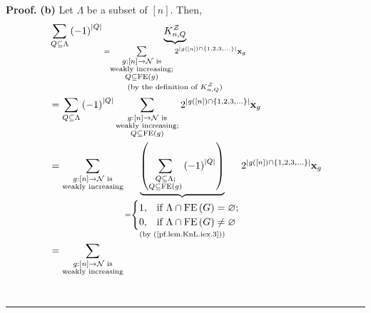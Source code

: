\documentclass[numbers=enddot,12pt,final,onecolumn,notitlepage]{scrartcl}%
\theoremstyle{definition}
\newenvironment{proof}[1][Proof]{\noindent\textbf{#1.} }{\ \rule{0.5em}{0.5em}}
\newenvironment{verlong}{}{}
\newenvironment{vershort}{}{}
\let\sumnonlimits\sum
\renewcommand{\sum}{\sumnonlimits\limits}
\begin{document}
\begin{verlong}
\begin{proof}
% 
\textbf{(b)} Let $\Lambda$ be a subset of $\left[  n\right]  $. Then,%
\begin{align*}
&  \sum_{Q\subseteq\Lambda}\left(  -1\right)  ^{\left\vert Q\right\vert
}\underbrace{K_{n,Q}^{\mathcal{Z}}}_{\substack{=\sum_{\substack{g:\left[
n\right]  \rightarrow\mathcal{N}\text{ is}\\\text{weakly increasing;}%
\\Q\subseteq\operatorname*{FE}\left(  g\right)  }}2^{\left\vert g\left(
\left[  n\right]  \right)  \cap\left\{  1,2,3,\ldots\right\}  \right\vert
}\mathbf{x}_{g}\\\text{(by the definition of }K_{n,Q}^{\mathcal{Z}}\text{)}%
}}\\
&  =\sum_{Q\subseteq\Lambda}\left(  -1\right)  ^{\left\vert Q\right\vert }%
\sum_{\substack{g:\left[  n\right]  \rightarrow\mathcal{N}\text{
is}\\\text{weakly increasing;}\\Q\subseteq\operatorname*{FE}\left(  g\right)
}}2^{\left\vert g\left(  \left[  n\right]  \right)  \cap\left\{
1,2,3,\ldots\right\}  \right\vert }\mathbf{x}_{g}\\
&  =\sum_{\substack{g:\left[  n\right]  \rightarrow\mathcal{N}\text{
is}\\\text{weakly increasing}}}\underbrace{\left(  \sum_{\substack{Q\subseteq
\Lambda;\\Q\subseteq\operatorname*{FE}\left(  g\right)  }}\left(  -1\right)
^{\left\vert Q\right\vert }\right)  }_{\substack{=%
\begin{cases}
1, & \text{if }\Lambda\cap\operatorname*{FE}\left(  G\right)  =\varnothing;\\
0, & \text{if }\Lambda\cap\operatorname*{FE}\left(  G\right)  \neq\varnothing
\end{cases}
\\\text{(by (\ref{pf.lem.KnL.iex.3}))}}}2^{\left\vert g\left(  \left[
n\right]  \right)  \cap\left\{  1,2,3,\ldots\right\}  \right\vert }%
\mathbf{x}_{g}\\
&  =\sum_{\substack{g:\left[  n\right]  \rightarrow\mathcal{N}\text{
is}\\\text{weakly increasing}}}%

\end{align*}
\end{proof}
\end{verlong}
\end{document}
